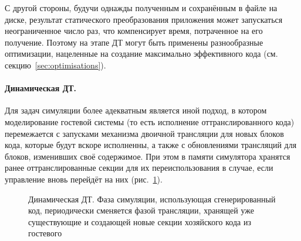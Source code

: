С другой стороны, будучи однажды полученным и сохранённым в файле на диске, результат статического преобразования приложения может запускаться неограниченное число раз, что компенсирует время, потраченное на его получение. Поэтому на этапе ДТ могут быть применены разнообразные оптимизации, нацеленные на создание максимально эффективного кода (см. секцию~\ref{sec:optimisations}).

\paragraph{Динамическая ДТ.} Для задач симуляции более адекватным является иной подход, в котором моделирование гостевой системы (то есть исполнение оттранслированного кода) перемежается с запусками механизма двоичной трансляции для новых блоков кода, которые будут вскоре исполненны, а также с обновлениями трансляций для блоков, изменивших своё содержимое. При этом в памяти симулятора хранятся ранее оттранслированные секции для их переиспользования в случае, если управление вновь перейдёт на них (рис.~\ref{fig:dynamic-bt}).

\begin{figure}[htb]
    \centering
    \caption[Динамическая ДТ]{Динамическая ДТ. Фаза симуляции, использующая сгенерированный код, периодически сменяется фазой трансляции, хранящей уже существующие  и создающей новые секции хозяйского кода из гостевого}
    \label{fig:dynamic-bt}
\end{figure}

